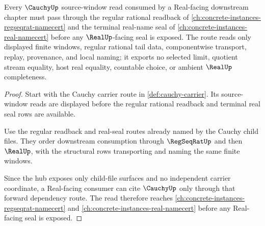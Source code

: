\begin{theorem}
\label{thm:cauchy-regseqrat-real-forward-dependency}
Every $\CauchyUp$ source-window read consumed by a Real-facing downstream chapter must pass through the regular rational readback of \autoref{ch:concrete-instances-regseqrat-namecert} and the terminal real-name seal of \autoref{ch:concrete-instances-real-namecert} before any $\RealUp$-facing seal is exposed. The route reads only displayed finite windows, regular rational tail data, componentwise transport, replay, provenance, and local naming; it exports no selected limit, quotient stream equality, host real equality, countable choice, or ambient $\RealUp$ completeness.
\end{theorem}
\begin{proof}
Start with the Cauchy carrier route in \autoref{def:cauchy-carrier}. Its source-window reads are displayed before the regular rational readback and terminal real seal rows are available.

Use the regular readback and real-seal routes already named by the Cauchy child files. They order downstream consumption through $\RegSeqRatUp$ and then $\RealUp$, with the structural rows transporting and naming the same finite windows.

Since the hub exposes only child-file surfaces and no independent carrier coordinate, a Real-facing consumer can cite $\CauchyUp$ only through that forward dependency route. The read therefore reaches \autoref{ch:concrete-instances-regseqrat-namecert} and \autoref{ch:concrete-instances-real-namecert} before any Real-facing seal is exposed.
\end{proof}
